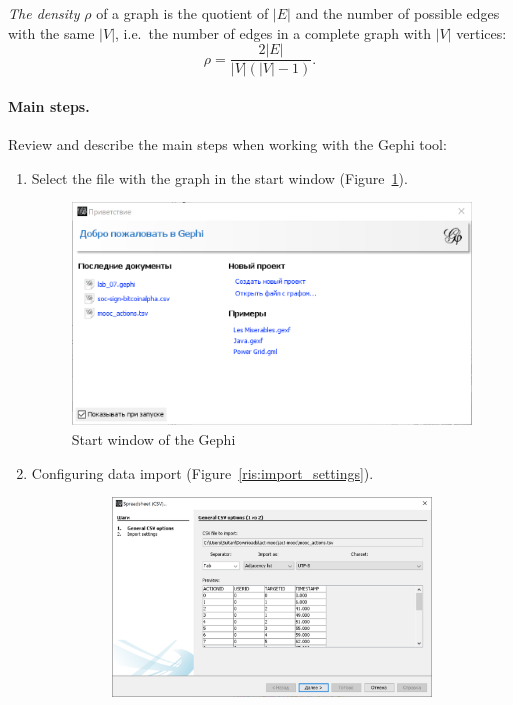 \textit{The density} $\rho$ of a graph is the quotient of $\lvert E \rvert$ and the number of possible edges with the same $\lvert V \rvert$, i.e.\ the number of edges in a complete graph with $\lvert V \rvert$ vertices:
\begin{equation*}
    \rho = \frac{2\lvert E \rvert}{\lvert V \rvert(\lvert V \rvert - 1)}.
\end{equation*}

\paragraph{Main steps.}
Review and describe the main steps when working with the Gephi tool:
\begin{enumerate}
    \item Select the file with the graph in the start window (Figure~\ref{ris:start}).
        \begin{figure}[H]
        \center
        \includegraphics[width=\textwidth]{img/start.png}
        \caption{Start window of the Gephi}
        \label{ris:start}
        \end{figure}
    \item Configuring data import (Figure~\ref{ris:import_settings}).
        \begin{figure}[H]
            \centering
            \begin{subfigure}{.49\textwidth}
                \centering
                \includegraphics[width=\textwidth]{img/csv_options.png}

\end{subfigure}
\end{figure}
\end{enumerate}
